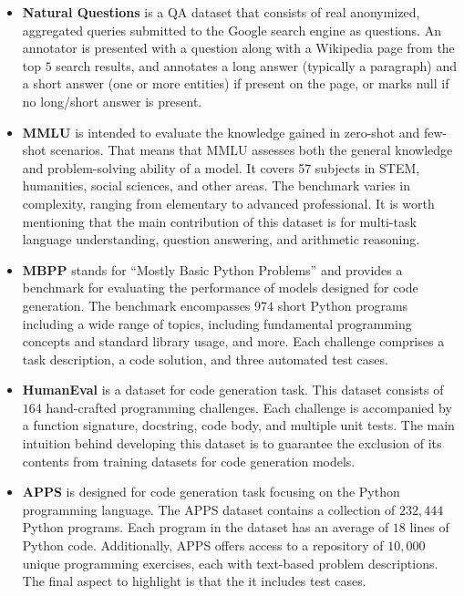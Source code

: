 \documentclass[conference]{IEEEtran}
\begin{document}
\begin{itemize}
    
    \item  \textbf{Natural Questions} \cite{kwiatkowski-etal-2019-natural} is a QA dataset that consists of real anonymized, aggregated queries submitted to the Google search engine as questions. An annotator is presented with a question along with a Wikipedia page from the top $5$ search results, and annotates a long answer (typically a paragraph) and a short answer (one or more entities) if present on the page, or marks null if no long/short answer is present.

    \item \textbf{MMLU} \cite{hendrycks2021measuring} is intended to evaluate the knowledge gained in zero-shot and few-shot scenarios. That means that MMLU assesses both the general knowledge and problem-solving ability of a model. It covers 57 subjects in STEM, humanities, social sciences, and other areas. The benchmark varies in complexity, ranging from elementary to advanced professional.  It is worth mentioning that the main contribution of this dataset is for multi-task language understanding, question answering, and arithmetic reasoning. 
    
    \item  \textbf{MBPP} \cite{austin2021program} stands for ``Mostly Basic Python Problems'' and provides a benchmark for evaluating the performance of models designed for code generation. The benchmark encompasses $974$ short Python programs including a wide range of topics, including fundamental programming concepts and standard library usage, and more. Each challenge comprises a task description, a code solution, and three automated test cases. 
    
    \item \textbf{HumanEval} \cite{choi-etal-2018-quac} is a dataset for code generation task. This dataset consists of $164$ hand-crafted programming challenges.  Each challenge is accompanied by a function signature, docstring, code body, and multiple unit tests.  The main intuition behind developing this dataset is to guarantee the exclusion of its contents from training datasets for code generation models.
    
     \item \textbf{APPS} \cite{hendrycksapps2021} is designed for code generation task focusing on the Python programming language. The APPS dataset contains a collection of $232,444$ Python programs.   Each program in the dataset has an average of $18$ lines of Python code. Additionally, APPS offers access to a repository of $10,000$ unique programming exercises, each with text-based problem descriptions.   The final aspect to highlight is that the it includes test cases. 
     

\end{itemize}
\end{document}
